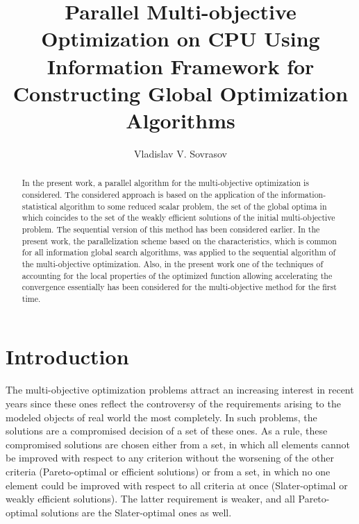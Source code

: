 \documentclass{llncs}
\begin{document}
%
\mainmatter              %
%
\title{Parallel Multi-objective Optimization on CPU Using Information Framework for
Constructing Global Optimization Algorithms}
%
%
\author{Vladislav V. Sovrasov}
%
%
%

\maketitle              %

\begin{abstract}
In the present work, a parallel algorithm for the multi-objective optimization is considered. The
considered approach is based on the application of the information-statistical algorithm to some
reduced scalar problem, the set of the global optima in which coincides to the set of the
weakly efficient solutions of the initial multi-objective problem. The sequential version of this
method has been considered earlier. In the present work, the parallelization scheme based on
the characteristics, which is common for all information global search algorithms,
was applied to the sequential algorithm of the multi-objective optimization. Also, in the present
work one of the techniques of accounting for the local properties of the optimized function
allowing accelerating the convergence essentially has been considered for the multi-objective
method for the first time.

\end{abstract}
%
\section{Introduction}
The multi-objective optimization problems attract an increasing interest in recent years since
these ones reflect the controversy of the requirements arising to the modeled objects of real
world the most completely. In such problems, the solutions are a compromised decision of a set
of these ones. As a rule, these compromised solutions are chosen either from a set, in which all
elements cannot be improved with respect to any criterion without the worsening of the other
criteria (Pareto-optimal or efficient solutions) or from a set, in which no one element could be
improved with respect to all criteria at once (Slater-optimal or weakly efficient solutions). The
latter requirement is weaker, and all Pareto-optimal solutions are the Slater-optimal ones as
well.
\end{document}
